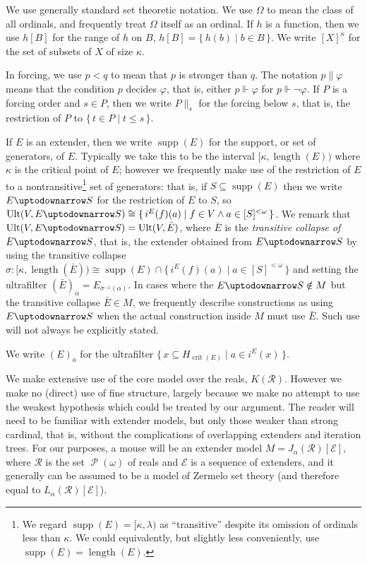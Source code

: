 \documentclass[
twoside,
]{article}
\theoremstyle{definition}
\theoremstyle{remark}
\newcommand{\below}[2]{#1{\|_{#2}}}
\newcommand{\ufFromExt}[2]{(#1)_{#2}}
\DeclareMathOperator{\supp}{supp}   %
\newcommand{\ords}{\Omega}
\DeclareMathOperator{\ps}{\mathcal{P}}
\newcommand\reals{\mathcal{R}}
\newcommand{\forces}{\Vdash}
\newcommand{\decides}{\parallel}
\renewcommand{\phi}{\varphi}
\newcommand{\ecut}{{\uptodownarrow}} %
\newcommand{\cut}{{\vert}}
\DeclareMathOperator{\len}{length}
\newcommand{\set}[1]{\{\,#1\,\}}
\DeclareMathOperator{\crit}{crit}
\DeclareMathOperator{\ult}{Ult}
\begin{document}
We use generally standard set theoretic notation.    We use $\ords$
to mean the class of all ordinals, and frequently treat $\ords$ itself
as an ordinal.    If $h$ is a function, then  we use $h[B]$ for the range of $h$ on $B$,
$h[B]=\set{h(b)\mid b\in B}$.   We write $[X]^{\kappa}$ for the set of
subsets of $X$ of size $\kappa$.

In forcing,  we use $p< q$ to mean that $p$ is stronger than $q$.  
The notation $p\decides\phi$ means that the
condition $p$ decides $\phi$, that is, either $p\forces \phi$ for
$p\forces\lnot \phi$. 
If $P$ is a forcing order and $s\in P$,  then we write $\below{P}{s}$
for the forcing below $s$, that is, the restriction of $P$ to  $\set{t\in P\mid t\leq s}$.

If $E$ is an extender, then we write $\supp(E)$ for the support, or
set of generators, of $E$.  Typically we take this to be  the interval
$[\kappa,\len(E))$ where $\kappa$ is the critical point of $E$;
however we frequently make use of the restriction of $E$ to a
nontransitive\footnote{We regard $\supp(E)=[\kappa,\lambda)$ as
  ``transitive'' despite its omission of ordinals less than
  $\kappa$.   We could equivalently, but slightly less conveniently, use
  $\supp(E)=\len(E)$.} 
set of generators: that is, if $S\subseteq\supp(E)$ then
we write $E\ecut S$ for the restriction of $E$ to $S$, so $\ult(V,E\ecut
S)\cong\set{i^{E}(f)(a)\mid f\in V\land a\in[S]^{<\omega}}$.   We
remark that $\ult(V,E\ecut S)=\ult(V,\bar E)$, where $\bar E$ is the
\emph{transitive collapse of $E\ecut S$}, that is, the extender 
obtained from $E\ecut S$ by using the transitive collapse $\sigma\colon
[\kappa,\len(\bar E))\cong \supp(E)\cap
\set{i^E(f)(a)\mid a\in[S]^{<\omega}}$ and setting
the ultrafilter
$(\bar E)_{\alpha}=E_{\sigma^{-1}(\alpha)}$.
In cases where the $E\ecut S\notin M$ but the 
transitive collapse $\bar E\in M$, we frequently describe
constructions as using $E\ecut S$ when the actual construction inside
$M$ must use  $\bar E$.  Such use will not always be explicitly
stated. 

We write $\ufFromExt{E}{a}$ for the ultrafilter $\set{x\subseteq
  H_{\crit(E)}\mid a\in i^E(x)}$.


We make extensive use of the core model over the reals, $K(\reals)$.
However we make no (direct) use of fine structure, largely because we
make no attempt to use the weakest hypothesis which could be treated
by our argument.    The reader will need to be familiar with extender
models, but only those weaker than strong cardinal, that is, without the
complications of overlapping extenders and iteration trees.     For
our purposes, a mouse will be an extender model $M=J_{\alpha}(\reals)[\mathcal{E}]$, where
$\reals$ is the set $\ps(\omega)$ of reals and $\mathcal{E}$ is a
sequence of extenders, and it generally can be
assumed to be a model of Zermelo set theory (and therefore equal to $L_{\alpha}(\reals)[\mathcal{E}]$).
\end{document}
